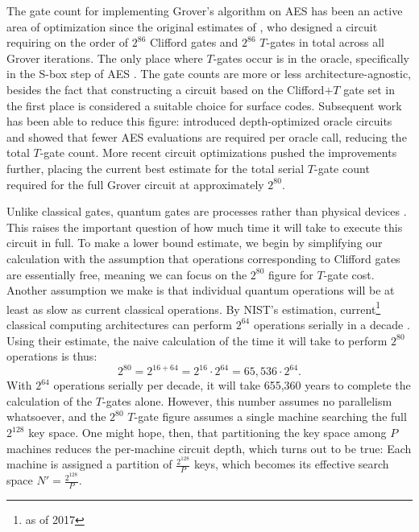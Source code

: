 The gate count for implementing Grover's algorithm on AES has been an active area of optimization since the original estimates of \textcite{grassl2015applyinggroversalgorithmaes}, who designed a circuit requiring on the order of $2^{86}$ Clifford gates and $2^{86}$ $T$-gates in total across all Grover iterations. The only place where $T$-gates occur is in the oracle, specifically in the S-box step of AES \cite{cryptoeprint:2019/1146}. The gate counts are more or less architecture-agnostic, besides the fact that constructing a circuit based on the Clifford$+T$ gate set in the first place is considered a suitable choice for surface codes. Subsequent work has been able to reduce this figure: \textcite{cryptoeprint:2019/1146} introduced depth-optimized oracle circuits and showed that fewer AES evaluations are required per oracle call, reducing the total $T$-gate count. More recent circuit optimizations \cite{resourcefficientAES, cryptoeprint} pushed the improvements further, placing the current best estimate for the total serial $T$-gate count required for the full Grover circuit at approximately $2^{80}$.

Unlike classical gates, quantum gates are processes rather than physical devices \cite{jaques2024ches_presentation}. This raises the important question of how much time it will take to execute this circuit in full. To make a lower bound estimate, we begin by simplifying our calculation with the assumption that operations corresponding to Clifford gates are essentially free, meaning we can focus on the $2^{80}$ figure for $T$-gate cost. 
Another assumption we make is that individual quantum operations will be at least as slow as current classical operations. By NIST's estimation, current\footnote{as of 2017} classical computing architectures can perform $2^{64}$ operations serially in a decade \cite{NIST2016pqc}. Using their estimate, the naive calculation of the time it will take to perform $2^{80}$ operations is thus:
\[2^{80} = 2^{16+64} = 2^{16} \cdot 2^{64} = 65,536 \cdot 2^{64}.
\]
With $2^{64}$ operations serially per decade, it will take 655,360 years to complete the calculation of the $T$-gates alone. However, this number assumes no parallelism whatsoever, and the $2^{80}$ $T$-gate figure assumes a single machine searching the full $2^{128}$ key space. One might hope, then, that partitioning the key space among $P$ machines reduces the per-machine circuit depth, which turns out to be true: 
Each machine is assigned a partition of $\frac{2^{128}}{P}$ keys, which becomes its effective search space $N' = \frac{2^{128}}{P}$. 


